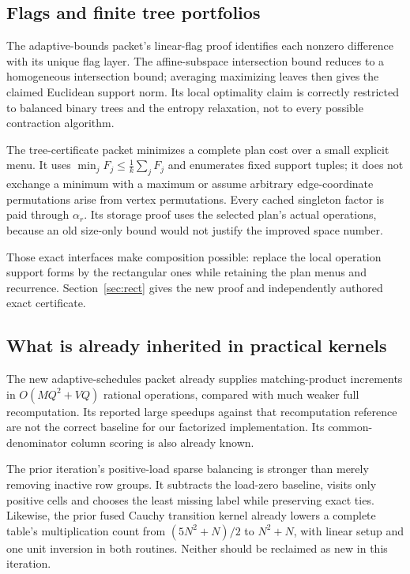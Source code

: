\documentclass[11pt,letterpaper]{article}
\theoremstyle{remark}\newtheorem{remark}[theorem]{Remark}
\begin{document}
\subsection{Flags and finite tree portfolios}
The adaptive-bounds packet's linear-flag proof identifies each nonzero difference with its unique flag layer. The affine-subspace intersection bound reduces to a homogeneous intersection bound; averaging maximizing leaves then gives the claimed Euclidean support norm. Its local optimality claim is correctly restricted to balanced binary trees and the entropy relaxation, not to every possible contraction algorithm.

The tree-certificate packet minimizes a complete plan cost over a small explicit menu. It uses $\min_jF_j\le\frac1k\sum_jF_j$ and enumerates fixed support tuples; it does not exchange a minimum with a maximum or assume arbitrary edge-coordinate permutations arise from vertex permutations. Every cached singleton factor is paid through $\alpha_r$. Its storage proof uses the selected plan's actual operations, because an old size-only bound would not justify the improved space number.

Those exact interfaces make composition possible: replace the local operation support forms by the rectangular ones while retaining the plan menus and recurrence. Section~\ref{sec:rect} gives the new proof and independently authored exact certificate.

\subsection{What is already inherited in practical kernels}
The new adaptive-schedules packet already supplies matching-product increments in $O(MQ^2+VQ)$ rational operations, compared with much weaker full recomputation. Its reported large speedups against that recomputation reference are not the correct baseline for our factorized implementation. Its common-denominator column scoring is also already known.

The prior iteration's positive-load sparse balancing is stronger than merely removing inactive row groups. It subtracts the load-zero baseline, visits only positive cells and chooses the least missing label while preserving exact ties. Likewise, the prior fused Cauchy transition kernel already lowers a complete table's multiplication count from $(5N^2+N)/2$ to $N^2+N$, with linear setup and one unit inversion in both routines. Neither should be reclaimed as new in this iteration.
\end{document}
